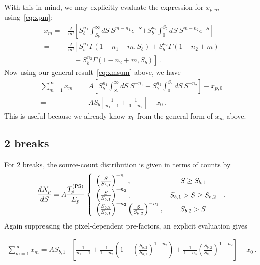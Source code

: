 With this in mind, we may explicitly evaluate the expression for $x_{p,m}$ using~\eqref{eq:xpm}:
\begin{equation}\begin{aligned}
x_{m} =& \frac{A}{m!} \left[ S_b^{n_1} \int_{S_b}^{\infty} dS~S^{m-n_1} e^{-S} \right. \left. + S_b^{n_2} \int_0^{S_b} dS~S^{m-n_2} e^{-S} \right] \\
=& \frac{A}{m!} \left[ S_b^{n_1} \Gamma(1-n_1+m,S_b)+ S_b^{n_2} \Gamma(1-n_2+m) \right. \\
&\left.~~~~- S_b^{n_2} \Gamma(1-n_2+m,S_b) \right]\,.
\end{aligned}\end{equation}
Now using our general result~\eqref{eq:xmsum} above, we have
\begin{equation}\begin{aligned}
\sum_{m=1}^{\infty} x_{m} =& A \left[ S_b^{n_1} \int_{S_b}^{\infty} dS~S^{-n_1} + S_b^{n_2} \int_0^{S_b} dS~S^{-n_2} \right] - x_{p,0} \\
=&  A S_b \left[ \frac{1}{n_1-1} + \frac{1}{1-n_2} \right] - x_{0}\,.
\end{aligned}\end{equation}
This is useful because we already know $x_{0}$ from the general form of $x_{m}$ above.

\subsection{2 breaks}
For 2 breaks, the source-count distribution is given in terms of counts by
\begin{equation}
\frac{dN_p}{dS} = A \frac{T_p^{({\rm PS})}}{E_p} \left\{ \begin{array}{lc} \left( \frac{S}{S_{b,1}} \right)^{-n_1}, & S \geq S_{b,1} \\ \left(\frac{S}{S_{b,1}}\right)^{-n_2}, & S_{b,1} > S \geq S_{b,2} \\ \left( \frac{S_{b,2}}{S_{b,1}} \right)^{-n_2} \left(\frac{S}{S_{b,2}}\right)^{-n_3}, & S_{b,2} > S \end{array} \right.\,.
\end{equation}
Again suppressing the pixel-dependent pre-factors, an explicit evaluation gives

\begin{equation}\begin{aligned}
\sum_{m=1}^{\infty} x_m = AS_{b,1} &\left[ \frac{1}{n_1-1} + \frac{1}{1-n_2} \left( 1 - \left( \frac{S_{b,2}}{S_{b,1}} \right)^{1-n_2} \right)+\frac{1}{1-n_3} \left( \frac{S_{b,2}}{S_{b,1}} \right)^{1-n_2} \right] - x_0 \,.
\end{aligned}\end{equation}


